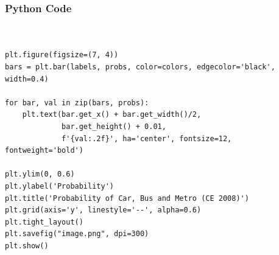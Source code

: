 \documentclass{beamer}
\begin{document}
\begin{frame}[fragile]
\frametitle{Python Code}
\begin{lstlisting}


plt.figure(figsize=(7, 4))
bars = plt.bar(labels, probs, color=colors, edgecolor='black', width=0.4)

for bar, val in zip(bars, probs):
    plt.text(bar.get_x() + bar.get_width()/2,
             bar.get_height() + 0.01,
             f'{val:.2f}', ha='center', fontsize=12, fontweight='bold')

plt.ylim(0, 0.6)
plt.ylabel('Probability')
plt.title('Probability of Car, Bus and Metro (CE 2008)')
plt.grid(axis='y', linestyle='--', alpha=0.6)
plt.tight_layout()
plt.savefig("image.png", dpi=300)
plt.show()
\end{lstlisting}
\end{frame}
\end{document}
